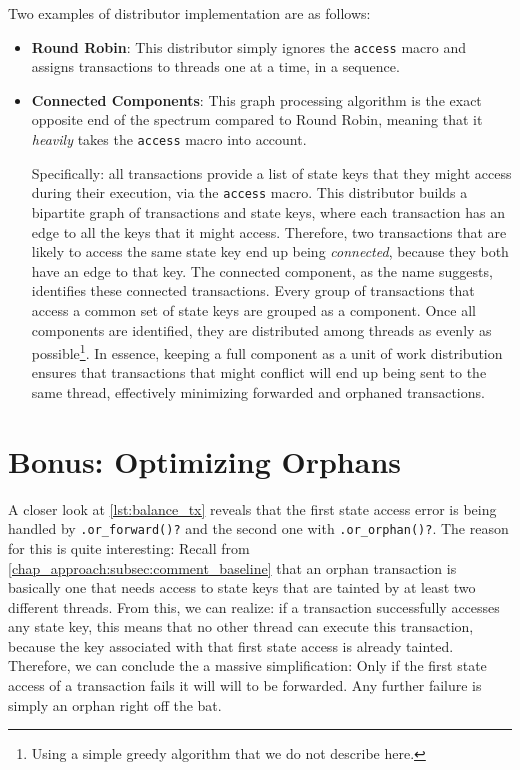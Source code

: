 Two examples of distributor implementation are as follows:

\begin{itemize}
	\item \textbf{Round Robin}: This distributor simply ignores the \texttt{access} macro and
	assigns transactions to threads one at a time, in a sequence.
	\item \textbf{Connected Components}\cite{nuutilaFindingStronglyConnected1994}: This graph
	processing algorithm is the exact opposite end of the spectrum compared to Round Robin, meaning
	that it \textit{heavily} takes the \texttt{access} macro into account.

	Specifically: all transactions provide a list of state keys
	that they might access during their execution, via the \texttt{access} macro. This distributor
	builds a bipartite graph of transactions and state keys, where each transaction has an edge to all the keys
	that it might access. Therefore, two transactions that are likely to access the same state key
	end up being \textit{connected}, because they both have an edge to that key. The connected
	component, as the name suggests, identifies these connected transactions. Every group of
	transactions that access a common set of state keys are grouped as a component. Once all
	components are identified, they are distributed among threads as evenly as possible\footnote{Using a simple greedy algorithm that we do not describe here.}. In essence,
	keeping a full component as a unit of work distribution ensures that transactions that might conflict will end up being sent to
	the same thread, effectively minimizing forwarded and orphaned transactions.
\end{itemize}

\section{Bonus: Optimizing Orphans} \label{chap_impl:sec:opt_orph}

A closer look at \ref{lst:balance_tx} reveals that the first state access error is being handled by
\texttt{.or\_forward()?} and the second one with \texttt{.or\_orphan()?}. The reason for this is
quite interesting: Recall from \ref{chap_approach:subsec:comment_baseline} that an orphan
transaction is basically one that needs access to state keys that are tainted by at least two
different threads. From this, we can realize: if a transaction successfully accesses any state key,
this means that no other thread can execute this transaction, because the key associated with that
first state access is already tainted. Therefore, we can conclude the a massive simplification: Only
if the first state access of a transaction fails it will will to be forwarded. Any further failure
is simply an orphan right off the bat.

